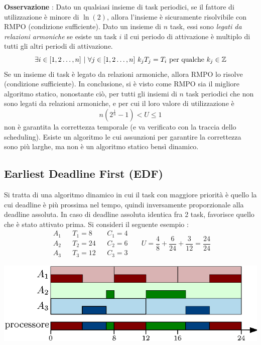 \documentclass[10pt, letterpaper]{report}
\begin{document}
\textbf{Osservazione} : Dato un qualsiasi insieme di task periodici, se il fattore di 
utilizzazione è minore di $\ln(2)$, allora l'insieme è sicuramente risolvibile con RMPO (condizione 
sufficiente).\acc
{} Dato un insieme di $n$ task, essi sono \textit{legati da relazioni 
armoniche} se esiste un task $i$ il cui periodo di attivazione è multiplo di tutti gli altri 
periodi di attivazione.
$$ \exists i\in[1,2\dots,n] \ | \ \forall j\in[1,2\dots,n] \  k_j T_j=T_i \text{ per qualche }k_j\in\Z$$ 
 Se un insieme di task è legato da relazioni armoniche, allora RMPO lo risolve (condizione 
sufficiente).\acc 
In conclusione, si è visto come RMPO sia il migliore algoritmo statico, nonostante ciò, per 
tutti gli insiemi di $n$ task periodici che non sono legati da relazioni armoniche, e per cui 
il loro valore di utilizzazione è $$ n(2^{\frac{1}{n}}-1)<U\le 1$$
non è garantita la correttezza temporale (e va verificato con la traccia dello scheduling). 
Esiste un algoritmo le cui assunzioni per garantire la correttezza sono più larghe, ma non è 
un algoritmo statico bensì dinamico.
\subsection{Earliest Deadline First (EDF)}
Si tratta di una algoritmo dinamico in cui il task con maggiore priorità è 
quello la cui deadline è più prossima nel tempo, quindi inversamente 
proporzionale alla deadline assoluta. In caso di deadline 
assoluta identica fra 2 task, favorisce quello che è 
stato attivato prima. Si consideri il seguente esempio : 
$$\begin{matrix}
    A_1&&T_1=8&&C_1=4\\ 
    A_2&&T_2=24&&C_2=6\\ 
    A_3&&T_3=12&&C_3=3
\end{matrix}  \ \ \ \ \ \ \ U=\frac{4}{8}+\frac{6}{24}+\frac{3}{12}=\frac{24}{24}$$\begin{center}
    \includegraphics[width=1\textwidth ]{images/EsempioEDF.eps}
\end{center}
\end{document}
